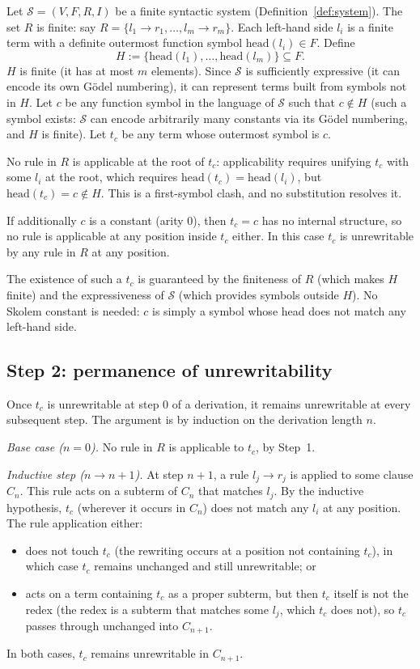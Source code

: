 \documentclass[11pt]{article}
\begin{document}
Let $\mathcal{S} = (V, F, R, I)$ be a finite syntactic system
(Definition~\ref{def:system}). The set $R$ is finite: say
$R = \{l_1 \to r_1, \ldots, l_m \to r_m\}$. Each left-hand side $l_i$
is a finite term with a definite outermost function symbol
$\mathrm{head}(l_i) \in F$. Define
\[
  H := \{\mathrm{head}(l_1), \ldots, \mathrm{head}(l_m)\} \subseteq F.
\]
$H$ is finite (it has at most $m$ elements). Since $\mathcal{S}$ is
sufficiently expressive (it can encode its own G\"odel numbering), it
can represent terms built from symbols not in $H$. Let $c$ be any
function symbol in the language of $\mathcal{S}$ such that
$c \notin H$ (such a symbol exists: $\mathcal{S}$ can encode
arbitrarily many constants via its G\"odel numbering, and $H$ is
finite). Let $t_c$ be any term whose outermost symbol is $c$.

No rule in $R$ is applicable at the root of $t_c$: applicability
requires unifying $t_c$ with some $l_i$ at the root, which requires
$\mathrm{head}(t_c) = \mathrm{head}(l_i)$, but
$\mathrm{head}(t_c) = c \notin H$. This is a first-symbol clash, and
no substitution resolves it.

If additionally $c$ is a constant (arity $0$), then $t_c = c$ has no
internal structure, so no rule is applicable at any position inside
$t_c$ either. In this case $t_c$ is unrewritable by any rule in $R$ at
any position.

The existence of such a $t_c$ is guaranteed by the finiteness of $R$
(which makes $H$ finite) and the expressiveness of $\mathcal{S}$ (which
provides symbols outside $H$). No Skolem constant is needed: $c$ is
simply a symbol whose head does not match any left-hand side.

\subsection{Step 2: permanence of unrewritability}

Once $t_c$ is unrewritable at step $0$ of a derivation, it remains
unrewritable at every subsequent step. The argument is by induction on
the derivation length $n$.

\emph{Base case ($n = 0$).} No rule in $R$ is applicable to $t_c$, by
Step~1.

\emph{Inductive step ($n \to n + 1$).} At step $n + 1$, a rule
$l_j \to r_j$ is applied to some clause $C_n$. This rule acts on a
subterm of $C_n$ that matches $l_j$. By the inductive hypothesis, $t_c$
(wherever it occurs in $C_n$) does not match any $l_i$ at any position.
The rule application either:
\begin{itemize}
  \item does not touch $t_c$ (the rewriting occurs at a position not
        containing $t_c$), in which case $t_c$ remains unchanged and
        still unrewritable; or
  \item acts on a term containing $t_c$ as a proper subterm, but then
        $t_c$ itself is not the redex (the redex is a subterm that
        matches some $l_j$, which $t_c$ does not), so $t_c$ passes
        through unchanged into $C_{n+1}$.
\end{itemize}
In both cases, $t_c$ remains unrewritable in $C_{n+1}$.
\end{document}
